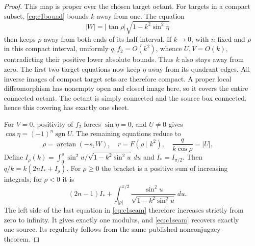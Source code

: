 \documentclass[11pt,a4paper]{article}
\theoremstyle{remark}\newtheorem{remark}[theorem]{Remark}
\begin{document}
\begin{proof}
This map is proper over the chosen target octant. For targets in a compact
subset, \eqref{eq:c1bound} bounds $k$ away from one. The equation
\[
 |W|=|\tan\rho|\sqrt{1-k^2\sin^2\eta}
\]
then keeps $\rho$ away from both ends of its half-interval.
If $k\to0$, with $n$ fixed and $\rho$ in this compact interval,
uniformly $q,f_2=O(k^2)$, whence $U,V=O(k)$, contradicting their
positive lower absolute bounds. Thus $k$ also stays away from zero.
The first two target equations now keep $\eta$ away from its quadrant
edges. All inverse images of compact target sets are therefore compact.
A proper local diffeomorphism has nonempty open and closed image here,
so it covers the entire connected octant. The octant is simply connected
and the source box connected, hence this covering has exactly one sheet.

For $V=0$, positivity of $f_2$ forces $\sin\eta=0$, and $U\ne0$ gives
$\cos\eta=(-1)^n\operatorname{sgn}U$. The remaining equations reduce to
\begin{equation}\label{eq:c1seam}
 \rho=\arctan(-s_1W),\quad r=F(\rho\mid k^2),\quad
 \frac{q}{k\cos\rho}=|U|.
\end{equation}
Define
$I_\rho(k)=\int_0^\rho\sin^2u/\sqrt{1-k^2\sin^2u}\,du$ and
$I_*=I_{\pi/2}$. Then $q/k=k(2nI_*+I_\rho)$.
For $\rho\ge0$ the bracket is a positive sum of increasing integrals;
for $\rho<0$ it is
\[
 (2n-1)I_*+\int_{|\rho|}^{\pi/2}
 \frac{\sin^2u}{\sqrt{1-k^2\sin^2u}}\,du.
\]
The left side of the last equation in \eqref{eq:c1seam} therefore
increases strictly from zero to infinity. It gives exactly one modulus,
and \eqref{eq:c1seam} recovers exactly one source. Its regularity follows
from the same published nonconjugacy theorem.


\end{proof}
\end{document}
